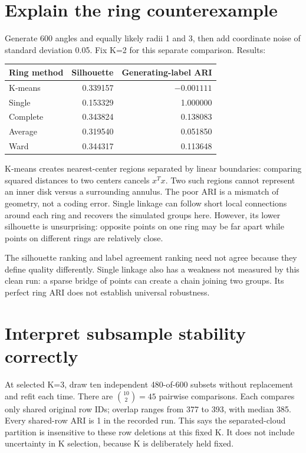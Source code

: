 \section{Explain the ring counterexample}
Generate 600 angles and equally likely radii 1 and 3, then add coordinate noise of standard deviation 0.05.
Fix K=2 for this separate comparison. Results:
\begin{center}\begin{tabular}{lrr}\toprule
Ring method&Silhouette&Generating-label ARI\\\midrule
K-means&0.339157&$-0.001111$\\Single&0.153329&1.000000\\
Complete&0.343824&0.138083\\Average&0.319540&0.051850\\Ward&0.344317&0.113648\\\bottomrule\end{tabular}\end{center}
K-means creates nearest-center regions separated by linear boundaries: comparing squared distances to two centers cancels $x^Tx$.
Two such regions cannot represent an inner disk versus a surrounding annulus. The poor ARI is a mismatch of geometry, not a coding error.
Single linkage can follow short local connections around each ring and recovers the simulated groups here.
However, its lower silhouette is unsurprising: opposite points on one ring may be far apart while points on different rings are relatively close.

The silhouette ranking and label agreement ranking need not agree because they define quality differently.
Single linkage also has a weakness not measured by this clean run: a sparse bridge of points can create a chain joining two groups.
Its perfect ring ARI does not establish universal robustness.

\section{Interpret subsample stability correctly}
At selected K=3, draw ten independent 480-of-600 subsets without replacement and refit each time.
There are $\binom{10}{2}=45$ pairwise comparisons. Each compares only shared original row IDs;
overlap ranges from 377 to 393, with median 385. Every shared-row ARI is 1 in the recorded run.
This says the separated-cloud partition is insensitive to these row deletions at this fixed K.
It does not include uncertainty in K selection, because K is deliberately held fixed.

